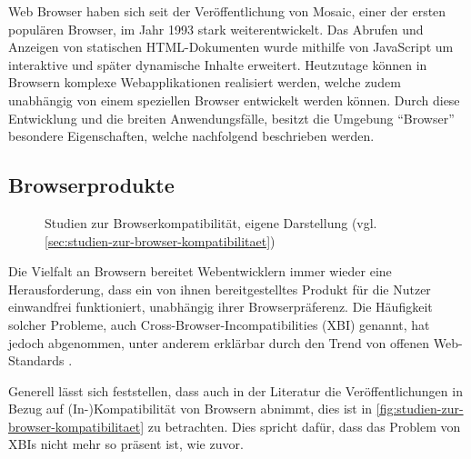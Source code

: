 Web Browser haben sich seit der Veröffentlichung von Mosaic, einer der ersten populären Browser, im Jahr 1993 stark weiterentwickelt. Das Abrufen und Anzeigen von statischen HTML-Dokumenten wurde mithilfe von JavaScript um interaktive und später dynamische Inhalte erweitert. Heutzutage können in Browsern komplexe Webapplikationen realisiert werden, welche zudem unabhängig von einem speziellen Browser entwickelt werden können. Durch diese Entwicklung und die breiten Anwendungsfälle, besitzt die Umgebung \enquote{Browser} besondere Eigenschaften, welche nachfolgend beschrieben werden.

\subsection{Browserprodukte}
\label{sec:browserprodukte}

\begin{wrapfigure}[19]{r}{0.45\textwidth}
\centering
{}
\caption{Studien zur Browserkompatibilität, eigene Darstellung (vgl. \ref{sec:studien-zur-browser-kompatibilitaet})}
\label{fig:studien-zur-browser-kompatibilitaet}
\end{wrapfigure}

Die Vielfalt an Browsern bereitet Webentwicklern immer wieder eine Herausforderung, dass ein von ihnen bereitgestelltes Produkt für die Nutzer einwandfrei funktioniert, unabhängig ihrer Browserpräferenz. Die Häufigkeit solcher Probleme, auch Cross-Browser-Incompatibilities (XBI) genannt, hat jedoch abgenommen, unter anderem erklärbar durch den Trend von offenen Web-Standards \cite{W3CStandards}.

Generell lässt sich feststellen, dass auch in der Literatur die Veröffentlichungen in Bezug auf (In-)Kompatibilität von Browsern abnimmt, dies ist in \autoref{fig:studien-zur-browser-kompatibilitaet} zu betrachten. Dies spricht dafür, dass das Problem von XBIs nicht mehr so präsent ist, wie zuvor.

